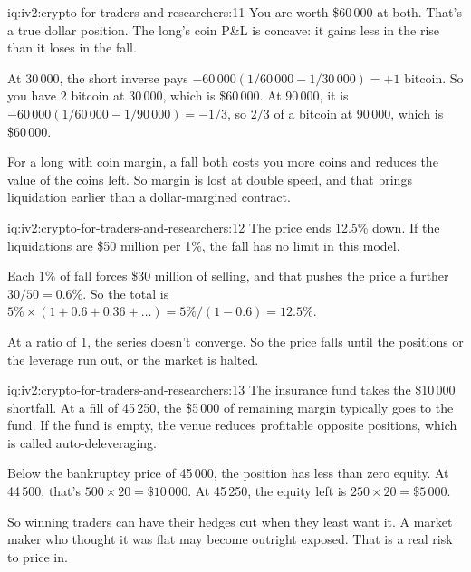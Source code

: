 \begin{solution}{iq:iv2:crypto-for-traders-and-researchers:11}
You are worth \$60\,000 at both. That's a true dollar position. The long's coin P\&L is concave: it gains less in the rise than it loses in the fall.

At 30\,000, the short inverse pays $-60\,000(1/60\,000 - 1/30\,000) = +1$ bitcoin. So you have 2 bitcoin at 30\,000, which is \$60\,000. At 90\,000, it is $-60\,000(1/60\,000 - 1/90\,000) = -1/3$, so $2/3$ of a bitcoin at 90\,000, which is \$60\,000.

For a long with coin margin, a fall both costs you more coins and reduces the value of the coins left. So margin is lost at double speed, and that brings liquidation earlier than a dollar-margined contract.

\end{solution}

\begin{solution}{iq:iv2:crypto-for-traders-and-researchers:12}
The price ends 12.5\% down. If the liquidations are \$50 million per 1\%, the fall has no limit in this model.

Each 1\% of fall forces \$30 million of selling, and that pushes the price a further $30/50 = 0.6\%$. So the total is $5\% \times (1 + 0.6 + 0.36 + \dots) = 5\%/(1 - 0.6) = 12.5\%$.

At a ratio of 1, the series doesn't converge. So the price falls until the positions or the leverage run out, or the market is halted.

\end{solution}

\begin{solution}{iq:iv2:crypto-for-traders-and-researchers:13}
The insurance fund takes the \$10\,000 shortfall. At a fill of 45\,250, the \$5\,000 of remaining margin typically goes to the fund. If the fund is empty, the venue reduces profitable opposite positions, which is called auto-deleveraging.

Below the bankruptcy price of 45\,000, the position has less than zero equity. At 44\,500, that's $500 \times 20 = \$10\,000$. At 45\,250, the equity left is $250 \times 20 = \$5\,000$.

So winning traders can have their hedges cut when they least want it. A market maker who thought it was flat may become outright exposed. That is a real risk to price in.

\end{solution}


